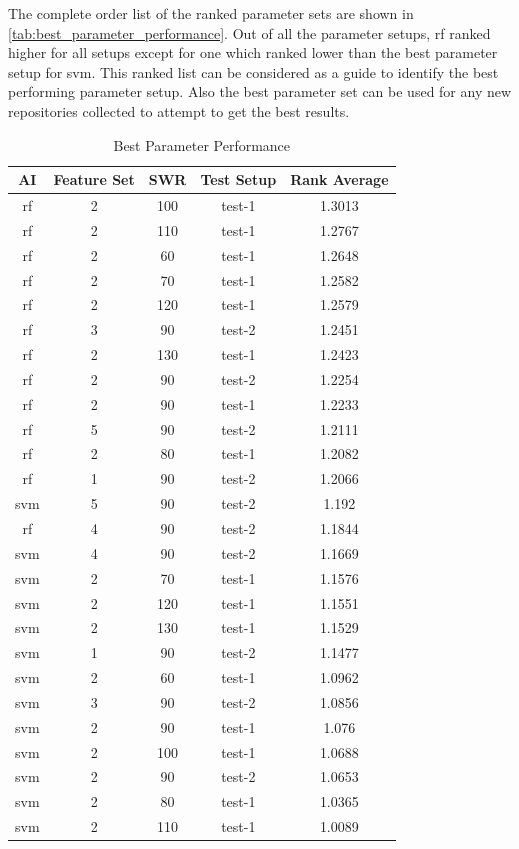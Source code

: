 The complete order list of the ranked parameter sets are shown in \autoref{tab:best_parameter_performance}. Out of all the parameter setups, \gls{rf} ranked higher for all setups except for one which ranked lower than the best parameter setup for \gls{svm}. This ranked list can be considered as a guide to identify the best performing parameter setup. Also the best parameter set can be used for any new repositories collected to attempt to get the best results.

\begin{table}
\begin{center}
    \begin{tabular}{|c|c|c|c|c|}
        \hline
        AI & Feature Set & SWR & Test Setup & Rank Average \\
        \hline
        rf & 2 & 100 & test-1 & 1.3013 \\
        rf & 2 & 110 & test-1 & 1.2767 \\
        rf & 2 & 60 & test-1 & 1.2648 \\
        rf & 2 & 70 & test-1 & 1.2582 \\
        rf & 2 & 120 & test-1 & 1.2579 \\
        rf & 3 & 90 & test-2 & 1.2451 \\
        rf & 2 & 130 & test-1 & 1.2423 \\
        rf & 2 & 90 & test-2 & 1.2254 \\
        rf & 2 & 90 & test-1 & 1.2233 \\
        rf & 5 & 90 & test-2 & 1.2111 \\
        rf & 2 & 80 & test-1 & 1.2082 \\
        rf & 1 & 90 & test-2 & 1.2066 \\
        svm & 5 & 90 & test-2 & 1.192 \\
        rf & 4 & 90 & test-2 & 1.1844 \\
        svm & 4 & 90 & test-2 & 1.1669 \\
        svm & 2 & 70 & test-1 & 1.1576 \\
        svm & 2 & 120 & test-1 & 1.1551 \\
        svm & 2 & 130 & test-1 & 1.1529 \\
        svm & 1 & 90 & test-2 & 1.1477 \\
        svm & 2 & 60 & test-1 & 1.0962 \\
        svm & 3 & 90 & test-2 & 1.0856 \\
        svm & 2 & 90 & test-1 & 1.076 \\
        svm & 2 & 100 & test-1 & 1.0688 \\
        svm & 2 & 90 & test-2 & 1.0653 \\
        svm & 2 & 80 & test-1 & 1.0365 \\
        svm & 2 & 110 & test-1 & 1.0089 \\
        \hline
    \end{tabular}
\end{center}
\caption{Best Parameter Performance}
\label{tab:best_parameter_performance}
\end{table}

